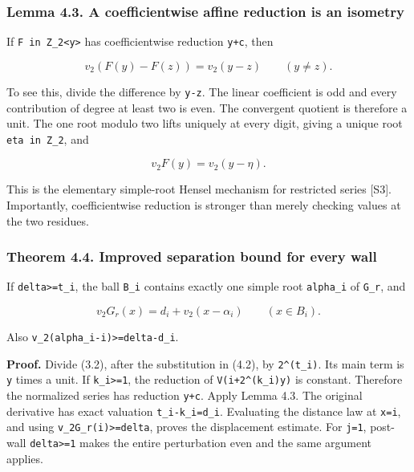 \documentclass[11pt,letterpaper]{article}
\begin{document}
\subsubsection{Lemma 4.3. A coefficientwise affine reduction is an isometry}\label{lemma-4.3.-a-coefficientwise-affine-reduction-is-an-isometry}

If \texttt{F\ in\ Z\_2\textless{}y\textgreater{}} has coefficientwise reduction \texttt{y+c}, then

\[
v_2(F(y)-F(z))=v_2(y-z)\qquad(y\ne z).
\]

To see this, divide the difference by \texttt{y-z}. The linear coefficient is odd and every contribution of degree at least two is even. The convergent quotient is therefore a unit. The one root modulo two lifts uniquely at every digit, giving a unique root \texttt{eta\ in\ Z\_2}, and

\[
v_2F(y)=v_2(y-\eta).
\]

This is the elementary simple-root Hensel mechanism for restricted series {[}S3{]}. Importantly, coefficientwise reduction is stronger than merely checking values at the two residues.

\subsubsection{Theorem 4.4. Improved separation bound for every wall}\label{theorem-4.4.-improved-separation-bound-for-every-wall}

If \texttt{delta\textgreater{}=t\_i}, the ball \texttt{B\_i} contains exactly one simple root \texttt{alpha\_i} of \texttt{G\_r}, and

\[
\boxed{v_2G_r(x)=d_i+v_2(x-\alpha_i)\qquad(x\in B_i).} \tag{4.3}
\]

Also \texttt{v\_2(alpha\_i-i)\textgreater{}=delta-d\_i}.

\textbf{Proof.} Divide (3.2), after the substitution in (4.2), by \texttt{2\^{}(t\_i)}. Its main term is \texttt{y} times a unit. If \texttt{k\_i\textgreater{}=1}, the reduction of \texttt{V(i+2\^{}(k\_i)y)} is constant. Therefore the normalized series has reduction \texttt{y+c}. Apply Lemma 4.3. The original derivative has exact valuation \texttt{t\_i-k\_i=d\_i}. Evaluating the distance law at \texttt{x=i}, and using \texttt{v\_2G\_r(i)\textgreater{}=delta}, proves the displacement estimate. For \texttt{j=1}, post-wall \texttt{delta\textgreater{}=1} makes the entire perturbation even and the same argument applies.
\end{document}
